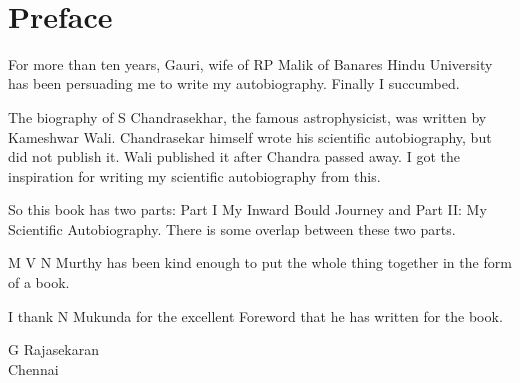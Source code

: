 ~
\pagecolor{white}

\chapter*{Preface}
\sf

For more than ten years, Gauri, wife of RP Malik of Banares Hindu University has been persuading me to write my autobiography. Finally I succumbed.

The biography of S Chandrasekhar, the famous astrophysicist, was
written by Kameshwar Wali. Chandrasekar himself wrote his scientific
autobiography, but did not publish it. Wali published it after Chandra
passed away. I got the inspiration for writing my scientific autobiography
from this.

So this book has two parts: Part I My Inward Bould Journey and Part II:
My Scientific Autobiography. There is some overlap between these two
parts.

M V N Murthy has been kind enough to put the whole thing together in the 
form of a book.

I thank N Mukunda for the excellent Foreword that he has written for 
the book.

\vskip 1cm
\begin{flushright}
G Rajasekaran\\
Chennai
\end{flushright}
